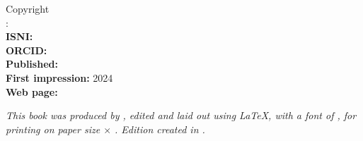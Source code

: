 \cleardoublepage %

\begin{slide-frame}
\end{slide-frame}

\newpage
\noindent Copyright \textcopyright\ \BookEditionYear\ \BookAuthor\\ %
\noindent \BookTitle: \BookSubTitle\\

\noindent \textbf{ISNI:} \AuthorNumberISNI\\
\noindent \textbf{ORCID:} \AuthorNumberOrcid\\

\noindent \textbf{Published:} \BookPublishingEditor\\ %
\noindent \textbf{First impression:} 2024\\ %
\noindent \textbf{Web page:} \BookHomePage\\ %

\vfill
\thispagestyle{empty}

{%
\normalsize \itshape This book was produced by \BookAuthor, %
edited and laid out using \LaTeX, %
with a font of \FprShowFont, %
for printing on paper size \BookPaperHeight $\times$ \BookPaperWidth. %
Edition created in \BookEditionYear.%
}

